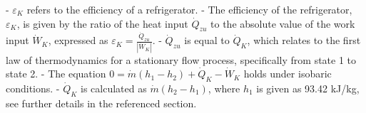 - \( \varepsilon_{K} \) refers to the efficiency of a refrigerator.
- The efficiency of the refrigerator, \( \varepsilon_{K} \), is given by the ratio of the heat input \( \dot{Q}_{zu} \) to the absolute value of the work input \( \dot{W}_{K} \), expressed as \( \varepsilon_{K} = \frac{\dot{Q}_{zu}}{\left| \dot{W}_{K} \right|} \).
- \( \dot{Q}_{zu} \) is equal to \( \dot{Q}_{K} \), which relates to the first law of thermodynamics for a stationary flow process, specifically from state 1 to state 2.
- The equation \( 0 = \dot{m} (h_{1} - h_{2}) + \dot{Q}_{K} - \dot{W}_{K} \) holds under isobaric conditions.
- \( \dot{Q}_{K} \) is calculated as \( \dot{m} (h_{2} - h_{1}) \), where \( h_{1} \) is given as 93.42 kJ/kg, see further details in the referenced section.